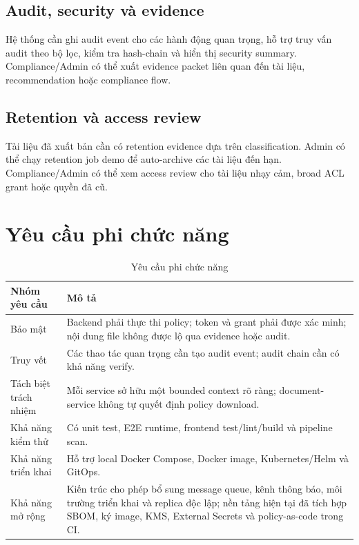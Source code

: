 \subsection{Audit, security và evidence}

Hệ thống cần ghi audit event cho các hành động quan trọng, hỗ trợ truy vấn audit theo bộ lọc, kiểm tra hash-chain và hiển thị security summary. Compliance/Admin có thể xuất evidence packet liên quan đến tài liệu, recommendation hoặc compliance flow.

\subsection{Retention và access review}

Tài liệu đã xuất bản cần có retention evidence dựa trên classification. Admin có thể chạy retention job demo để auto-archive các tài liệu đến hạn. Compliance/Admin có thể xem access review cho tài liệu nhạy cảm, broad ACL grant hoặc quyền đã cũ.

\section{Yêu cầu phi chức năng}

\begin{table}[H]
\centering
\caption{Yêu cầu phi chức năng}
\label{tab:nfr}
\begin{tabularx}{\textwidth}{p{}Y}
\toprule
\textbf{Nhóm yêu cầu} & \textbf{Mô tả} \\
\midrule
Bảo mật & Backend phải thực thi policy; token và grant phải được xác minh; nội dung file không được lộ qua evidence hoặc audit. \\
Truy vết & Các thao tác quan trọng cần tạo audit event; audit chain cần có khả năng verify. \\
Tách biệt trách nhiệm & Mỗi service sở hữu một bounded context rõ ràng; document-service không tự quyết định policy download. \\
Khả năng kiểm thử & Có unit test, E2E runtime, frontend test/lint/build và pipeline scan. \\
Khả năng triển khai & Hỗ trợ local Docker Compose, Docker image, Kubernetes/Helm và GitOps. \\
Khả năng mở rộng & Kiến trúc cho phép bổ sung message queue, kênh thông báo, môi trường triển khai và replica độc lập; nền tảng hiện tại đã tích hợp SBOM, ký image, KMS, External Secrets và policy-as-code trong CI. \\
\bottomrule
\end{tabularx}
\end{table}

